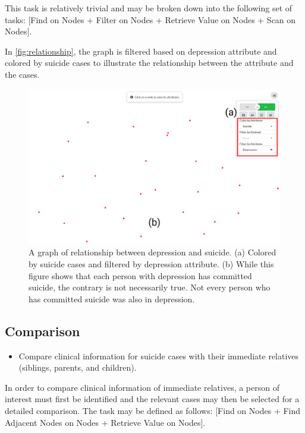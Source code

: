\documentclass{vgtc}                          %
\begin{document}
This task is relatively trivial and may be broken down into the following set of tasks: [Find on Nodes + Filter on Nodes + Retrieve Value on Nodes + Scan on Nodes].

In \autoref{fig:relationship}, the graph is filtered based on depression attribute and colored by suicide cases to illustrate the relationship between the attribute and the cases.

\begin{figure}[tb]
 \centering %
 \includegraphics[width=\columnwidth]{pictures/relationship.png}
 \caption{A graph of relationship between depression and suicide. (a) Colored by suicide cases and filtered by depression attribute. (b) While this figure shows that each person with depression has committed suicide, the contrary is not necessarily true. Not every person who has committed suicide was also in depression.}
 \label{fig:relationship}
\end{figure}

\subsection{Comparison}

\begin{itemize}
\item{Compare clinical information for suicide cases with their immediate relatives (siblings, parents, and children). }
\end{itemize}

In order to compare clinical information of immediate relatives, a person of interest must first be identified and the relevant cases may then be selected for a detailed comparison. The task may be defined as follows: [Find on Nodes + Find Adjacent Nodes on Nodes + Retrieve Value on Nodes].
\end{document}
